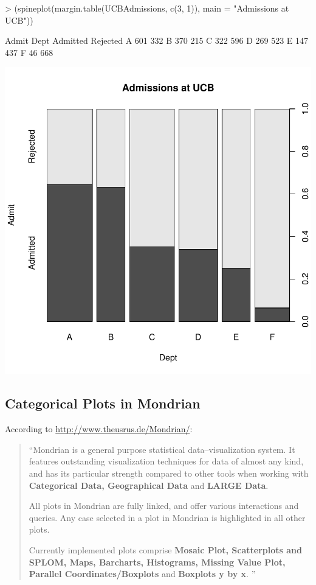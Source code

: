 \documentclass[12pt,letterpaper,final]{article}
\begin{document}
\begin{Schunk}
\begin{Sinput}
> (spineplot(margin.table(UCBAdmissions, c(3, 1)), main = "Admissions at UCB")) 
\end{Sinput}
\begin{Soutput}
    Admit
Dept Admitted Rejected
   A      601      332
   B      370      215
   C      322      596
   D      269      523
   E      147      437
   F       46      668
\end{Soutput}
\end{Schunk}
\includegraphics{lect_main-051}


\newpage


\subsection{Categorical Plots in Mondrian}


According to \url{http://www.theusrus.de/Mondrian/}:
\begin{quotation}
``Mondrian is a general purpose statistical data--visualization system. 
It features outstanding visualization techniques for data of almost any kind, 
and has its particular strength compared to other tools when working with 
{\bf Categorical Data, Geographical Data} and {\bf LARGE Data}. 

All plots in Mondrian are fully linked, and offer various interactions 
and queries. Any case selected in a plot in Mondrian is highlighted in all other plots. 

Currently implemented plots comprise {\bf Mosaic Plot, 
Scatterplots and SPLOM, Maps, Barcharts, Histograms, 
Missing Value Plot, Parallel Coordinates/Boxplots} and {\bf Boxplots y by x}. ''
\end{quotation}
\end{document}
